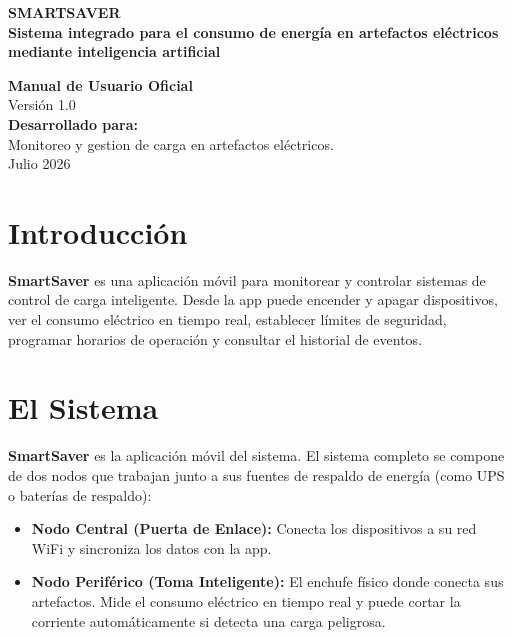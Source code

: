 \documentclass[10pt,a4paper]{article}
\begin{document}

\begin{titlepage}
    \centering
    \vspace*{1.5cm}
    {\Huge \bfseries \color{black} SMARTSAVER} \\[0.3cm]
    {\large \bfseries \color{black} Sistema integrado para el consumo de energía en artefactos eléctricos mediante inteligencia artificial} \\[1cm]
    \vspace*{1cm}
    
    {\large \textbf{Manual de Usuario Oficial}} \\[0.3cm]
    {\large Versión 1.0} \\[1.5cm]
    
    \textbf{Desarrollado para:} \\
    Monitoreo y gestion de carga en artefactos eléctricos. \\[0.5cm]
    
    \vfill
    {\large Julio 2026}
\end{titlepage}

\setcounter{page}{2}
\tableofcontents
\newpage
{}

\section{Introducción}
\textbf{SmartSaver} es una aplicación móvil para monitorear y controlar sistemas de control de carga inteligente. Desde la app puede encender y apagar dispositivos, ver el consumo eléctrico en tiempo real, establecer límites de seguridad, programar horarios de operación y consultar el historial de eventos.

\section{El Sistema}

\textbf{SmartSaver} es la aplicación móvil del sistema. El sistema completo se compone de dos nodos que trabajan junto a sus fuentes de respaldo de energía (como UPS o baterías de respaldo):

\begin{itemize}
    \item \textbf{Nodo Central (Puerta de Enlace):} Conecta los dispositivos a su red WiFi y sincroniza los datos con la app.
    \item \textbf{Nodo Periférico (Toma Inteligente):} El enchufe físico donde conecta sus artefactos. Mide el consumo eléctrico en tiempo real y puede cortar la corriente automáticamente si detecta una carga peligrosa.
\end{itemize}
\end{document}
